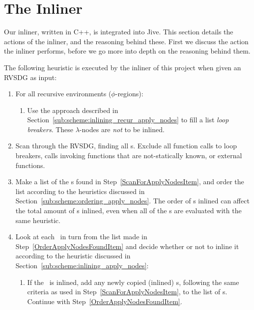 
\clearpage
\section{The Inliner}
\label{sec:scheme}

Our inliner, written in C++, is integrated into Jive. This section details the actions of the inliner, and the
reasoning behind these. First we discuss the action the inliner performs, before
we go more into depth on the reasoning behind them.

The following heuristic is executed by the inliner of this project when given an
RVSDG as input:

\begin{enumerate}
	\item For all recursive environments ($\phi$-regions):

	\begin{enumerate}
		\item Use the approach described in
Section~\ref{sub:scheme:inlining_recur_apply_nodes} to fill a list \textit{loop
breakers}. These $\lambda$-nodes are \textit{not} to be inlined.
		\label{MakeLoopBreakerListItem}
	\end{enumerate}

	\item Scan through the RVSDG, finding all \applyNode s. Exclude all function
calls to loop breakers, calls invoking functions that are not-statically known,
or external functions.
	\label{ScanForApplyNodesItem}

	\item Make a list of the \applyNode s found in
Step~\ref{ScanForApplyNodesItem}, and order the list according to the heuristics
discussed in Section~\ref{sub:scheme:ordering_apply_nodes}. The order of
\applyNode s inlined can affect the total amount of \applyNode s inlined, even
when all of the \applyNode s are evaluated with the same heuristic.
\label{OrderApplyNodesFoundItem}

	\item Look at each \applyNode~in turn from the list made in
Step~\ref{OrderApplyNodesFoundItem} and decide whether or not to inline it
according to the heuristic discussed in
Section~\ref{sub:scheme:inlining_apply_nodes}:
	\label{LookAtNextCallSiteItem}

	\begin{enumerate}
		\item If the \applyNode~is inlined, add any newly copied (inlined)
\applyNode s, following the same criteria as used in
Step~\ref{ScanForApplyNodesItem}, to the list of \applyNode s. Continue with
Step~\ref{OrderApplyNodesFoundItem}.


\end{enumerate}
\end{enumerate}
